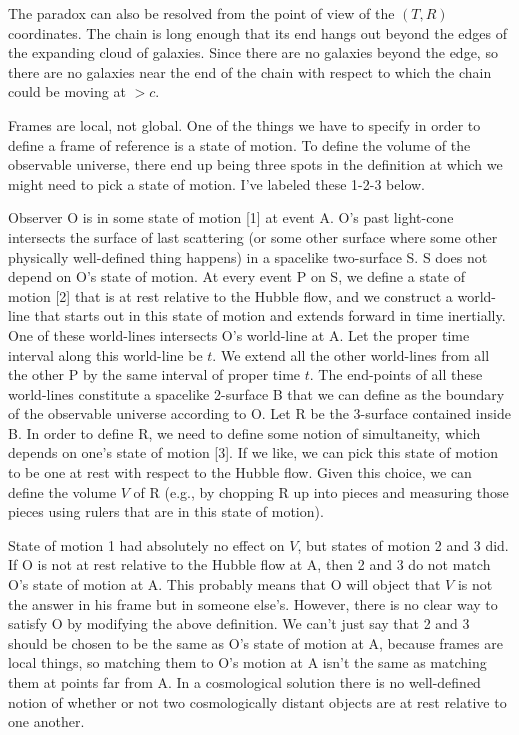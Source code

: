 The paradox can also be resolved from the point of view of the $(T,R)$ coordinates. The chain is
long enough that its end hangs out beyond the edges of the expanding cloud of galaxies. Since there are no galaxies beyond
the edge, so there are no galaxies near the end of the chain with respect to which the chain could be moving at $>c$.

Frames are local, not global. One of the things we have to
specify in order to define a frame of reference is a state of motion.
To define the volume of the observable universe, there end up being
three spots in the definition at which we might need to pick a state
of motion. I've labeled these 1-2-3 below.

Observer O is in some state of motion [1] at event A. O's past
light-cone intersects the surface of last scattering (or some other
surface where some other physically well-defined thing happens) in a
spacelike two-surface S. S does not depend on O's state of motion. At
every event P on S, we define a state of motion [2] that is at rest
relative to the Hubble flow, and we construct a world-line that
starts out in this state of motion and extends forward in time
inertially. One of these world-lines intersects O's world-line at A.
Let the proper time interval along this world-line be $t$. We extend
all the other world-lines from all the other P by the same interval
of proper time $t$. The end-points of all these world-lines constitute
a spacelike 2-surface B that we can define as the boundary of the
observable universe according to O. Let R be the 3-surface contained
inside B. In order to define R, we need to define some notion of
simultaneity, which depends on one's state of motion [3]. If we like,
we can pick this state of motion to be one at rest with respect to
the Hubble flow. Given this choice, we can define the volume $V$ of R
(e.g., by chopping R up into pieces and measuring those pieces using
rulers that are in this state of motion).

State of motion 1 had absolutely no effect on $V$, but states of motion
2 and 3 did. If O is not at rest relative to the Hubble flow at A,
then 2 and 3 do not match O's state of motion at A. This probably
means that O will object that $V$ is not the answer in his frame but in
someone else's. However, there is no clear way to satisfy O by
modifying the above definition. We can't just say that 2 and 3 should
be chosen to be the same as O's state of motion at A, because frames
are local things, so matching them to O's motion at A isn't the same
as matching them at points far from A. In a cosmological solution
there is no well-defined notion of whether or not two cosmologically
distant objects are at rest relative to one another.

